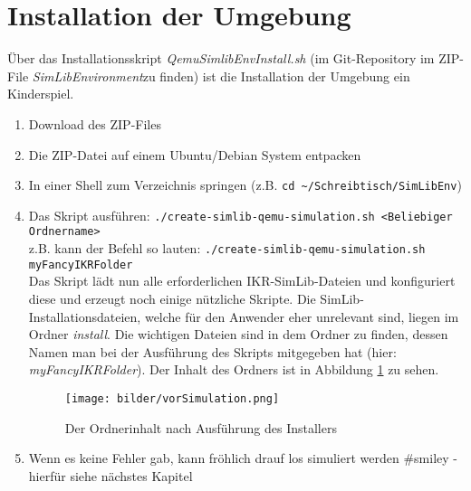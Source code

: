 \documentclass[11pt,div=14]{scrartcl}
\begin{document}
\section{Installation der Umgebung}
\label{Installation der Umgebung}
Über das Installationsskript \textit{QemuSimlibEnvInstall.sh} (im Git-Repository  im ZIP-File \textit{SimLibEnvironment}zu finden) ist die Installation der Umgebung ein Kinderspiel. 
\begin{enumerate}
\item Download des ZIP-Files
\item Die ZIP-Datei auf einem Ubuntu/Debian System entpacken

\item In einer Shell zum Verzeichnis springen (z.B. 
\colorbox{lightred}{\lstinline$cd ~/Schreibtisch/SimLibEnv$})


\item Das Skript ausführen: \colorbox{lightred}{\lstinline$./create-simlib-qemu-simulation.sh <Beliebiger Ordnername>$} \\ z.B. kann der Befehl so lauten: \colorbox{lightred}{\lstinline$./create-simlib-qemu-simulation.sh myFancyIKRFolder$}\\ Das Skript lädt nun alle erforderlichen IKR-SimLib-Dateien und konfiguriert diese und erzeugt noch einige nützliche Skripte. Die SimLib-Installationsdateien, welche für den Anwender eher unrelevant sind, liegen im Ordner \textit{install}. Die wichtigen Dateien sind in dem Ordner zu finden, dessen Namen man bei der Ausführung des Skripts mitgegeben hat (hier: \textit{myFancyIKRFolder}). Der Inhalt des Ordners ist in Abbildung \ref{fig:Ordnerinhalt} zu sehen. 

\begin{figure}[h!]
\centering
\texttt{[image: bilder/vorSimulation.png]}%
\caption{Der Ordnerinhalt nach Ausführung des Installers}%
\label{fig:Ordnerinhalt}%
\end{figure}

\item Wenn es keine Fehler gab, kann fröhlich drauf los simuliert werden \#smiley - hierfür siehe nächstes Kapitel 
\end{enumerate}
\end{document}
